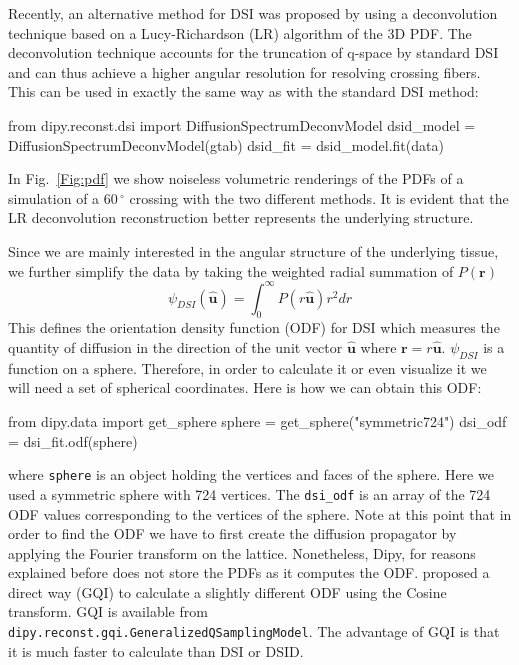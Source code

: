 \documentclass{bioinfo}
\begin{document}
Recently, an alternative method for DSI was proposed by
\citet{canales-rodriguez-etal:10} using a deconvolution technique
based on a Lucy-Richardson (LR) algorithm of the 3D PDF. The
deconvolution technique accounts for the truncation of q-space by
standard DSI and can thus achieve a higher angular resolution for
resolving crossing fibers. This can be used in exactly the same way as
with the standard DSI method:
\begin{python}
from dipy.reconst.dsi import
                      DiffusionSpectrumDeconvModel
dsid_model = DiffusionSpectrumDeconvModel(gtab)
dsid_fit = dsid_model.fit(data)
\end{python}

In Fig.~\ref{Fig:pdf} we show noiseless volumetric renderings of the PDFs of
a simulation of a $60\,^{\circ}$ crossing with the two different methods. It
is evident that the LR deconvolution reconstruction better represents the
underlying structure.

Since we are mainly interested in the angular structure of the underlying
tissue, we further simplify the data by taking the weighted radial summation of
$P(\mathbf{r})$
\begin{equation}
\psi_{DSI}(\hat{\mathbf{u}})=\int_{0}^{\infty}P(r\hat{\mathbf{u}})r^{2}dr\label{eq:ODF_DSI}
\end{equation}
\noindent This defines the orientation density function (ODF) for DSI which
measures the quantity of diffusion in the direction of the unit vector
$\mathbf{\hat{u}}$ where $\mathbf{r=}r\hat{\mathbf{u}}$. $\psi_{DSI}$ is a
function on a sphere. Therefore, in order to calculate it or even visualize it
we will need a set of spherical coordinates. Here is how we can obtain this ODF:
\begin{python}
from dipy.data import get_sphere
sphere = get_sphere("symmetric724")
dsi_odf = dsi_fit.odf(sphere)
\end{python}
where \texttt{sphere} is an object holding the vertices and faces of the
sphere. Here we used a symmetric sphere with 724 vertices. The
\texttt{dsi\_odf} is an array of the 724 ODF values corresponding to the
vertices of the sphere. Note at this point that in order to find the ODF we
have to first create the diffusion propagator by applying the Fourier transform
on the lattice. Nonetheless, Dipy, for reasons explained before does not store
the PDFs as it computes the ODF. \cite{yeh-etal:10} proposed a direct way (GQI) to
calculate a slightly different ODF using the Cosine transform. GQI is
available from \texttt{dipy.reconst.gqi.GeneralizedQSamplingModel}. The
advantage of GQI is that it is much faster to calculate than DSI or DSID.
\end{document}
